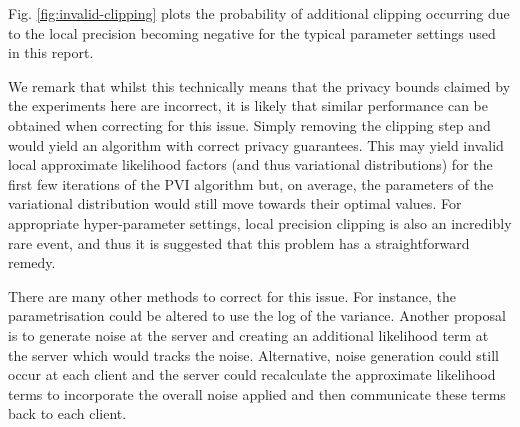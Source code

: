 Fig. \ref{fig:invalid-clipping} plots the probability of additional clipping occurring due to the local precision becoming negative for the typical parameter settings used in this report.

We remark that whilst this technically means that the privacy bounds claimed by the experiments here are incorrect, it is likely that similar performance can be obtained when correcting for this issue. Simply removing the clipping step and would yield an algorithm with correct privacy guarantees. This may yield invalid local approximate likelihood factors (and thus variational distributions) for the first few iterations of the PVI algorithm but, on average, the parameters of the variational distribution would still move towards their optimal values. For appropriate hyper-parameter settings, local precision clipping is also an incredibly rare event, and thus it is suggested that this problem has a straightforward remedy.

There are many other methods to correct for this issue. For instance, the parametrisation could be altered to use the log of the variance. Another proposal is to generate noise at the server and creating an additional likelihood term at the server which would tracks the noise. Alternative, noise generation could still occur at each client and the server could recalculate the approximate likelihood terms to incorporate the overall noise applied and then communicate these terms back to each client.




